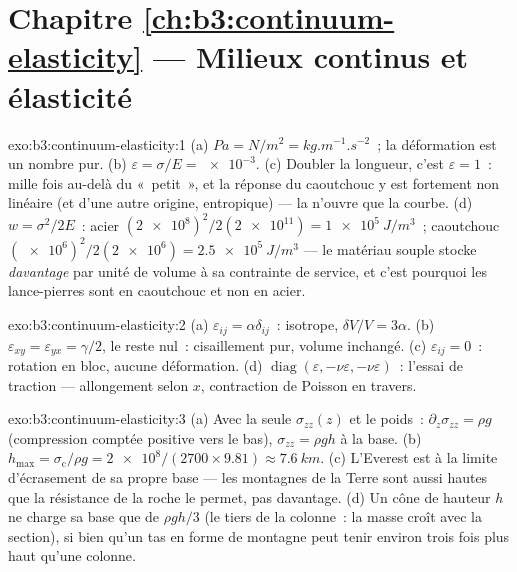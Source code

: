 \section*{Chapitre \ref{ch:b3:continuum-elasticity} --- Milieux continus et élasticité}

\begin{solution}{exo:b3:continuum-elasticity:1}
(a) $\unit{Pa} = \unit{N/m^2} = \unit{kg.m^{-1}.s^{-2}}$~; la
déformation est un nombre pur. (b) $\varepsilon = \sigma/E = \num{e-3}$. (c) Doubler
la longueur, c'est $\varepsilon = 1$~: mille fois au-delà du «~petit~»,
et la réponse du caoutchouc y est fortement non linéaire (et d'une
autre origine, entropique) --- la  n'ouvre que la courbe. (d) $w =
\sigma^2/2E$~: acier $(\num{2e8})^2/2(\num{2e11}) =
\qty{1e5}{J/m^3}$~; caoutchouc $(\num{e6})^2/2(\num{2e6}) =
\qty{2.5e5}{J/m^3}$ --- le matériau souple stocke \emph{davantage} par
unité de volume à sa contrainte de service, et c'est pourquoi les
lance-pierres sont en caoutchouc et non en acier.
\end{solution}

\begin{solution}{exo:b3:continuum-elasticity:2}
(a) $\varepsilon_{ij} = \alpha\delta_{ij}$~:  isotrope,
$\delta V/V = 3\alpha$. (b) $\varepsilon_{xy} = \varepsilon_{yx} =
\gamma/2$, le reste nul~: cisaillement pur, volume inchangé. (c)
$\varepsilon_{ij} = 0$~: rotation en bloc, aucune déformation. (d)
$\operatorname{diag}(\varepsilon, -\nu\varepsilon, -\nu\varepsilon)$~:
l'essai de traction --- allongement selon $x$, contraction de Poisson en travers.
\end{solution}

\begin{solution}{exo:b3:continuum-elasticity:3}
(a) Avec la seule $\sigma_{zz}(z)$ et le poids~: $\partial_z\sigma_{zz} =
\rho g$ (compression comptée positive vers le bas), $\sigma_{zz} = \rho
gh$ à la base. (b) $h_{\max} = \sigma_{\text{c}}/\rho g =
\num{2e8}/(2700 \times 9.81) \approx \qty{7.6}{km}$. (c) L'Everest est
à la limite d'écrasement de sa propre base --- les montagnes de la
Terre sont aussi hautes que la résistance de la roche le permet, pas
davantage. (d) Un cône de hauteur $h$ ne charge sa base que de
$\rho gh/3$ (le tiers de la colonne~: la masse croît avec la section),
si bien qu'un tas en forme de montagne peut tenir environ trois fois
plus haut qu'une colonne.
\end{solution}

